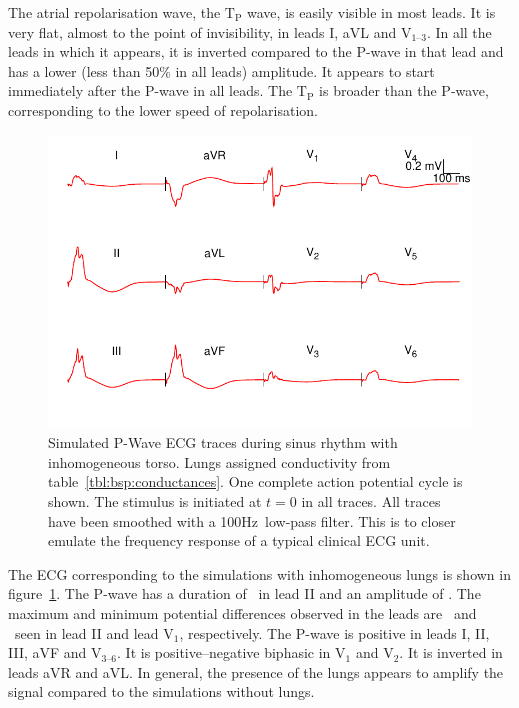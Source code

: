 The atrial repolarisation wave, the $\text{T}_{\text{P}}$ wave, is easily
visible in most leads.
It is very flat, almost to the point of invisibility, in leads I, aVL and
$\text{V}_{\text{1--3}}$.
In all the leads in which it appears, it is inverted compared to the P-wave in
that lead and has a lower (less than 50\% in all leads) amplitude.
It appears to start immediately after the P-wave in all leads.
The $\text{T}_{\text{P}}$ is broader than the P-wave, corresponding to the lower
speed of repolarisation.

\begin{figure}
\includegraphics{figures/bsp/ecg_lungs}
\caption[12 lead ECG during sinus rhythm, lungs present.]{
\label{bsp:fig:ecg_lungs}
Simulated P-Wave ECG traces during sinus rhythm with inhomogeneous torso.
Lungs assigned conductivity from table~\ref{tbl:bsp:conductances}.
One complete action potential cycle is shown.
The stimulus is initiated at $t = 0$ in all traces.
All traces have been smoothed with a \unit{100}{Hz}\ low-pass filter.
This is to closer emulate the frequency response of a typical clinical ECG unit.
}
\end{figure}

The ECG corresponding to the simulations with inhomogeneous lungs is shown in
figure~\ref{bsp:fig:ecg_lungs}.
The P-wave has a duration of \ in lead II and an amplitude of .
The maximum and minimum potential differences observed in the leads are
\ and \ seen in lead II and lead $\text{V}_{\text{1}}$, respectively.
The P-wave is positive in leads I, II, III, aVF and $\text{V}_{\text{3--6}}$.
It is positive--negative biphasic in $\text{V}_{\text{1}}$ and $\text{V}_{\text{2}}$.
It is inverted in leads aVR and aVL.
In general, the presence of the lungs appears to amplify the signal compared to
the simulations without lungs.

